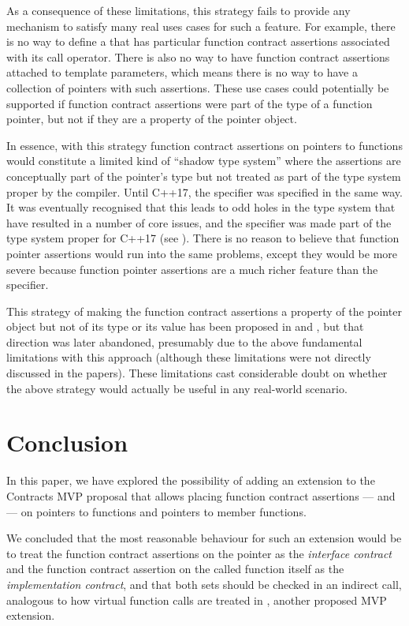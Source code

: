 As a consequence of these limitations, this strategy fails to provide any mechanism to satisfy many real uses cases for such a feature. For example, there is no way to define a  that has particular function contract assertions associated with its call operator. There is also no way to have function contract assertions attached to template parameters, which means there is no way to have a collection of pointers with such assertions. These use cases could potentially be supported if function contract assertions were part of the type of a function pointer, but not if they are a property of the pointer object.

In essence, with this strategy function contract assertions on pointers to functions would constitute a limited kind of ``shadow type system'' where the assertions are conceptually part of the pointer's type but not treated as part of the type system proper by the compiler. Until C++17, the  specifier was specified in the same way. It was eventually recognised that this leads to odd holes in the type system that have resulted in a number of core issues, and the  specifier was made part of the type system proper for C++17 (see \cite{P0012R1}). There is no reason to believe that function pointer assertions would run into the same problems, except they would be more severe because function pointer assertions are a much richer feature than the  specifier.

This strategy of making the function contract assertions a property of the pointer object but not of its type or its value has been proposed in \cite{P0246R0} and \cite{P0247R0}, but that direction was later abandoned, presumably due to the above fundamental limitations with this approach (although these limitations were not directly discussed in the papers). These limitations cast considerable doubt on whether the above strategy would actually be useful in any real-world scenario.

\section{Conclusion}

In this paper, we have explored the possibility of adding an extension to the Contracts MVP proposal \cite{P2900R7} that allows placing function contract assertions ---  and  --- on pointers to functions and pointers to member functions.

We concluded that the most reasonable behaviour for such an extension would be to treat the function contract assertions on the pointer as the \emph{interface contract} and the function contract assertion on the called function itself as the \emph{implementation contract}, and that both sets should be checked in an indirect call, analogous to how virtual function calls are treated in \cite{P3097R0}, another proposed MVP extension.

